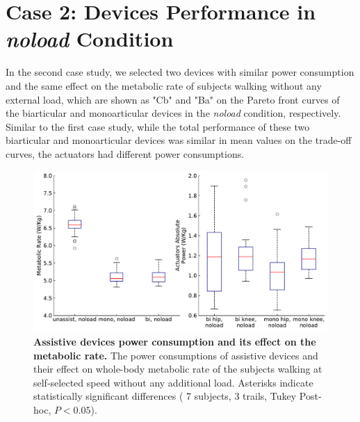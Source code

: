 \documentclass[10pt,letterpaper]{article}
\begin{document}
\section*{Case 2: Devices Performance in \textit{\textit{noload}} Condition}
In the second case study, we selected two devices with similar power consumption and the same effect on the metabolic rate of subjects walking without any external load, which are shown as "Cb" and "Ba" on the Pareto front curves of the biarticular and monoarticular devices in the {\it noload} condition, respectively. Similar to the first case study, while the total performance of these two biarticular and monoarticular devices was similar in mean values on the trade-off curves, the actuators had different power consumptions.\\
\begin{figure}[ht]   
	\centering
	\includegraphics[width=\linewidth]{Case_Studies/NoloadMono06_NoloadBi12/PaperFigure_BoxPlot.pdf}
	\vspace{1mm}
	\caption{\small{\textbf{Assistive devices power consumption and its effect on the metabolic rate.} The power consumptions of assistive devices and their effect on whole-body metabolic rate of the subjects walking at self-selected speed without any additional load. Asterisks indicate statistically significant differences ( 7 subjects, 3 trails, Tukey Post-hoc, $P < 0.05$).}}
	\label{Fig_Case02_Energy_Plot}
\end{figure}
\end{document}

